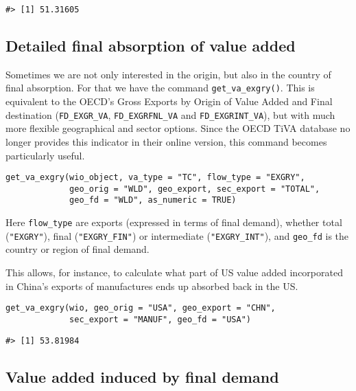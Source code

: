\begin{verbatim}
#> [1] 51.31605
\end{verbatim}

\hypertarget{detailed-final-absorption-of-value-added}{%
\subsection{Detailed final absorption of value added}\label{detailed-final-absorption-of-value-added}}

Sometimes we are not only interested in the origin, but also in the country of
final absorption. For that we have the command \texttt{get\_va\_exgry()}. This is
equivalent to the OECD's Gross Exports by Origin of Value Added and Final
destination (\texttt{FD\_EXGR\_VA}, \texttt{FD\_EXGRFNL\_VA} and \texttt{FD\_EXGRINT\_VA}), but with much
more flexible geographical and sector options. Since the OECD TiVA database no
longer provides this indicator in their online version, this command becomes
particularly useful.

\begin{verbatim}
get_va_exgry(wio_object, va_type = "TC", flow_type = "EXGRY",
             geo_orig = "WLD", geo_export, sec_export = "TOTAL",
             geo_fd = "WLD", as_numeric = TRUE)
\end{verbatim}

Here \texttt{flow\_type} are exports (expressed in terms of final demand), whether
total (\texttt{"EXGRY"}), final (\texttt{"EXGRY\_FIN"}) or intermediate (\texttt{"EXGRY\_INT"}), and
\texttt{geo\_fd} is the country or region of final demand.

This allows, for instance, to calculate what part of US value added incorporated
in China's exports of manufactures ends up absorbed back in the US.

\begin{verbatim}
get_va_exgry(wio, geo_orig = "USA", geo_export = "CHN",
             sec_export = "MANUF", geo_fd = "USA")
\end{verbatim}

\begin{verbatim}
#> [1] 53.81984
\end{verbatim}

\hypertarget{value-added-induced-by-final-demand}{%
\subsection{Value added induced by final demand}\label{value-added-induced-by-final-demand}}

